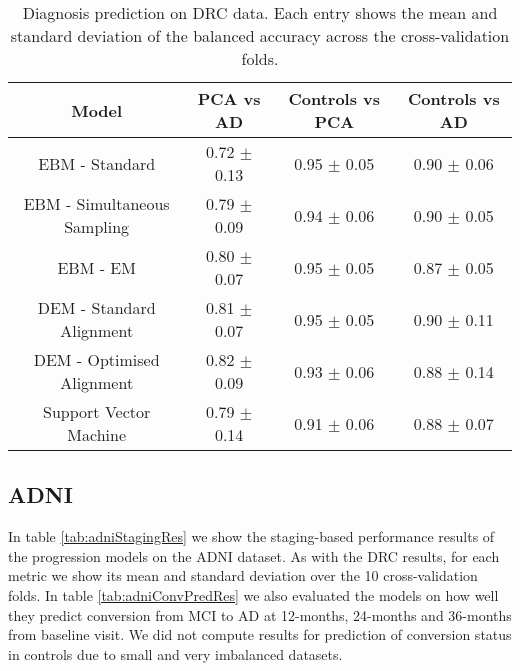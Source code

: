 \begin{table}[H]
\centering
 \begin{tabular}{c | c c c}
  Model & PCA vs AD &  Controls vs PCA & Controls vs AD\\
  
  \hline
  EBM - Standard & 0.72 $\pm$ 0.13 & 0.95 $\pm$ 0.05 & 0.90 $\pm$ 0.06\\
  EBM - Simultaneous Sampling & 0.79 $\pm$ 0.09 & 0.94 $\pm$ 0.06 & 0.90 $\pm$ 0.05\\
  EBM - EM & 0.80 $\pm$ 0.07 & 0.95 $\pm$ 0.05 & 0.87 $\pm$ 0.05\\
  DEM - Standard Alignment & 0.81 $\pm$ 0.07 & 0.95 $\pm$ 0.05 & 0.90 $\pm$ 0.11\\
  DEM - Optimised Alignment & 0.82 $\pm$ 0.09 & 0.93 $\pm$ 0.06 & 0.88 $\pm$ 0.14\\
  Support Vector Machine & 0.79 $\pm$ 0.14 & 0.91 $\pm$ 0.06 & 0.88 $\pm$ 0.07\\
  
 \end{tabular}
 \caption{Diagnosis prediction on DRC data. Each entry shows the mean and standard deviation of the balanced accuracy across the cross-validation folds. }
 \label{tab:drcDiagRes}
\end{table}

\subsection{ADNI}
\label{sec:perfADNIresults}

In table \ref{tab:adniStagingRes} we show the staging-based performance results of the progression models on the ADNI dataset. As with the DRC results, for each metric we show its mean and standard deviation over the 10 cross-validation folds. In table \ref{tab:adniConvPredRes} we also evaluated the models on how well they predict conversion from MCI to AD at 12-months, 24-months and 36-months from baseline visit. We did not compute results for prediction of conversion status in controls due to small and very imbalanced datasets.

